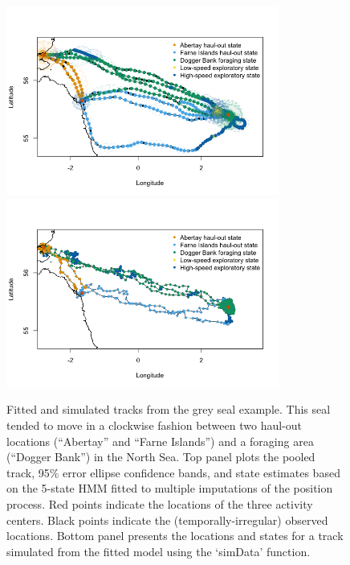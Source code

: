\documentclass[12pt]{article}\usepackage[]{graphicx}\usepackage[]{color}
\begin{document}
\begin{figure}[htbp]
  \centering
    \includegraphics[width=0.8\textwidth]{plot_greySealResults1.png}\\
    \includegraphics[width=0.8\textwidth]{plot_greySealResults2.png}
  \caption{Fitted and simulated tracks from the grey seal example. This seal tended to move in a clockwise fashion between two haul-out locations (``Abertay'' and ``Farne Islands'') and a foraging area (``Dogger Bank'') in the North Sea. Top panel plots the pooled track, 95\% error ellipse confidence bands, and state estimates based on the 5-state HMM fitted to multiple imputations of the position process. Red points indicate the locations of the three activity centers. Black points indicate the (temporally-irregular) observed locations. Bottom panel presents the locations and states for a track simulated from the fitted model using the `simData' function.}
  \label{fig:greySealStateSims}
\end{figure}
\end{document}
